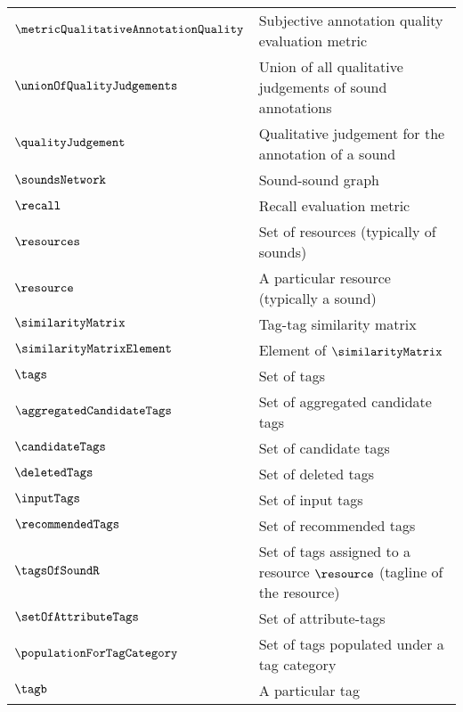 \begin{longtable}{p{1.4cm}p{11.1cm}}
\\ $\metricQualitativeAnnotationQuality$            & Subjective annotation quality evaluation metric
\\ $\unionOfQualityJudgements$                      & Union of all qualitative judgements of sound annotations
\\ $\qualityJudgement$                              & Qualitative judgement for the annotation of a sound
\\ $\soundsNetwork$                                 & Sound-sound graph
\\ $\recall$                                        & Recall evaluation metric
\\ $\resources$                                     & Set of resources (typically of sounds)
\\ $\resource$                                      & A particular resource (typically a sound)
\\ $\similarityMatrix$                              & Tag-tag similarity matrix
\\ $\similarityMatrixElement$                       & Element of $\similarityMatrix$
\\ $\tags$                                          & Set of tags
\\ $\aggregatedCandidateTags$                       & Set of aggregated candidate tags
\\ $\candidateTags$                                 & Set of candidate tags
\\ $\deletedTags$                                   & Set of deleted tags
\\ $\inputTags$                                     & Set of input tags
\\ $\recommendedTags$                               & Set of recommended tags
\\ $\tagsOfSoundR$                                  & Set of tags assigned to a resource $\resource$ (tagline of the resource)
\\ $\setOfAttributeTags$							& Set of attribute-tags
\\ $\populationForTagCategory$						& Set of tags populated under a tag category
\\ $\tagb$                                          & A particular tag

\end{longtable}
